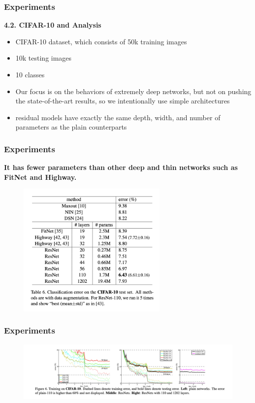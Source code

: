 \documentclass[
	11pt, %
]{beamer}
\begin{document}
\begin{frame}
	\frametitle{Experiments}

	\textbf{4.2. CIFAR-10 and Analysis}

	\begin{itemize}
		\item CIFAR-10 dataset, which consists of 50k training images
		\item 10k testing images
		\item 10 classes
		\item Our focus is on the behaviors of extremely deep networks, but not on pushing the state-of-the-art results, so we intentionally use simple architectures
		\item residual models have exactly the same depth, width, and number of parameters as the plain counterparts
	\end{itemize}
\end{frame}

\begin{frame}
	\frametitle{Experiments}

	\textbf{It has fewer parameters than other deep and thin networks such as FitNet and Highway. }

	\begin{figure}
		\centering
		\includegraphics[width=0.65\textwidth]{./images/Screenshot 2025-05-20 at 0.40.29.png}
	\end{figure}
\end{frame}


\begin{frame}
	\frametitle{Experiments}

	\begin{figure}
		\centering
		\includegraphics[width=\textwidth]{./images/Screenshot 2025-05-20 at 0.41.53.png}
	\end{figure}
\end{frame}
\end{document}
